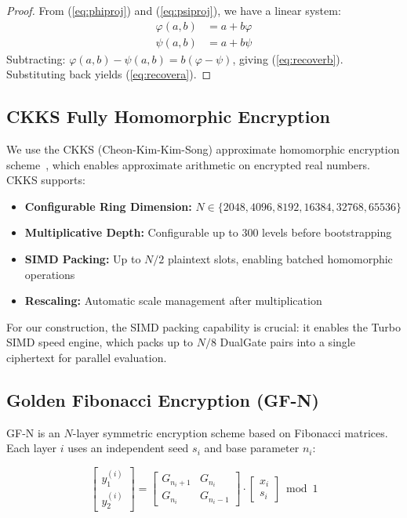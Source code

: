\documentclass[11pt,a4paper]{article}
\begin{document}
\begin{proof}
From (\ref{eq:phiproj}) and (\ref{eq:psiproj}), we have a linear system:
\begin{align*}
\varphi(a,b) &= a + b\varphi \\
\psi(a,b) &= a + b\psi
\end{align*}
Subtracting: $\varphi(a,b) - \psi(a,b) = b(\varphi - \psi)$, giving (\ref{eq:recoverb}).
Substituting back yields (\ref{eq:recovera}).
\end{proof}

\subsection{CKKS Fully Homomorphic Encryption}

We use the CKKS (Cheon-Kim-Kim-Song) approximate homomorphic encryption scheme~\cite{CHK+17}, which enables approximate arithmetic on encrypted real numbers. CKKS supports:

\begin{itemize}[nosep]
    \item \textbf{Configurable Ring Dimension:} $N \in \{2048, 4096, 8192, 16384, 32768, 65536\}$
    \item \textbf{Multiplicative Depth:} Configurable up to 300 levels before bootstrapping
    \item \textbf{SIMD Packing:} Up to $N/2$ plaintext slots, enabling batched homomorphic operations
    \item \textbf{Rescaling:} Automatic scale management after multiplication
\end{itemize}

For our construction, the SIMD packing capability is crucial: it enables the Turbo SIMD speed engine, which packs up to $N/8$ DualGate pairs into a single ciphertext for parallel evaluation.

\subsection{Golden Fibonacci Encryption (GF-N)}

GF-N is an $N$-layer symmetric encryption scheme based on Fibonacci matrices. Each layer $i$ uses an independent seed $s_i$ and base parameter $n_i$:

\begin{equation}
\begin{bmatrix} y_1^{(i)} \\ y_2^{(i)} \end{bmatrix} = 
\begin{bmatrix} G_{n_i+1} & G_{n_i} \\ G_{n_i} & G_{n_i-1} \end{bmatrix} 
\cdot \begin{bmatrix} x_i \\ s_i \end{bmatrix} \bmod 1 \label{eq:gfn}
\end{equation}
\end{document}
